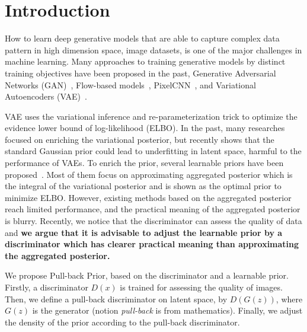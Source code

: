 \section{Introduction}

How to learn deep generative models that are able to capture complex data pattern in high dimension space, \EG image datasets, is one of the major challenges in machine learning. Many approaches to training generative models by distinct training objectives have been proposed in the past, \EG Generative Adversarial Networks (GAN)~\cite{goodfellow2014generative}, Flow-based models~\cite{dinh2016density,kingma2018glow}, PixelCNN~\cite{van2016conditional}, and Variational Autoencoders (VAE)~\cite{kingma2014auto,rezende_stochastic_2014}.

VAE uses the variational inference and re-parameterization trick to optimize the evidence lower bound of log-likelihood (ELBO). In the past, many researches~\cite{kingma2016improved,tomczak2016improving} focused on enriching the variational posterior, but recently \cite{tomczak2018vae} shows that the standard Gaussian prior could lead to underfitting in latent space, harmful to the performance of VAEs. To enrich the prior, several learnable priors have been proposed~\cite{tomczak2018vae,bauer2019resampled,takahashi2019variational}. Most of them focus on approximating aggregated posterior which is the integral of the variational posterior and is shown as the optimal prior to minimize ELBO. However, existing methods based on the aggregated posterior reach limited performance, and the practical meaning of the aggregated posterior is blurry. Recently, we notice that the discriminator can assess the quality of data and \textbf{we argue that it is advisable to adjust the learnable prior by a discriminator which has clearer practical meaning than approximating the aggregated posterior. } 

We propose Pull-back Prior, based on the discriminator and a learnable prior. 
Firstly, a discriminator $D(x)$ is trained for assessing the quality of images. Then, we define a pull-back discriminator on latent space, by $D(G(z))$, where $G(z)$ is the generator (notion \textit{pull-back} is from mathematics). Finally, we adjust the density of the prior according to the pull-back discriminator. 

